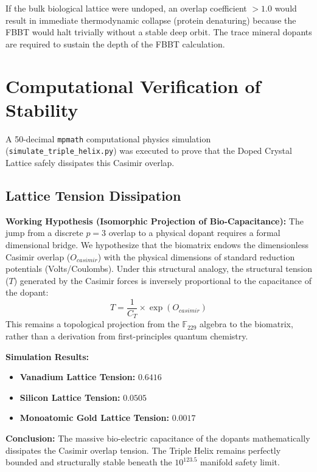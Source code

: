 If the bulk biological lattice were undoped, an overlap coefficient $> 1.0$ would result in immediate thermodynamic collapse (protein denaturing) because the FBBT would halt trivially without a stable deep orbit. The trace mineral dopants are required to sustain the depth of the FBBT calculation.

\section{Computational Verification of Stability}

A 50-decimal \texttt{mpmath} computational physics simulation (\texttt{simulate\_triple\_helix.py}) was executed to prove that the Doped Crystal Lattice safely dissipates this Casimir overlap.

\subsection{Lattice Tension Dissipation}
\textbf{Working Hypothesis (Isomorphic Projection of Bio-Capacitance):} 
The jump from a discrete $p=3$ overlap to a physical dopant requires a formal dimensional bridge. We hypothesize that the biomatrix endows the dimensionless Casimir overlap ($O_{casimir}$) with the physical dimensions of standard reduction potentials (Volts/Coulombs). Under this structural analogy, the structural tension ($T$) generated by the Casimir forces is inversely proportional to the capacitance of the dopant:
\begin{equation}
    T = \frac{1}{C_T} \times \exp(O_{casimir})
\end{equation}
This remains a topological projection from the $\mathbb{F}_{229}$ algebra to the biomatrix, rather than a derivation from first-principles quantum chemistry.

\textbf{Simulation Results:}
\begin{itemize}
    \item \textbf{Vanadium Lattice Tension:} $0.6416$
    \item \textbf{Silicon Lattice Tension:} $0.0505$
    \item \textbf{Monoatomic Gold Lattice Tension:} $0.0017$
\end{itemize}

\textbf{Conclusion:} The massive bio-electric capacitance of the dopants mathematically dissipates the Casimir overlap tension. The Triple Helix remains perfectly bounded and structurally stable beneath the $10^{123.5}$ manifold safety limit.

